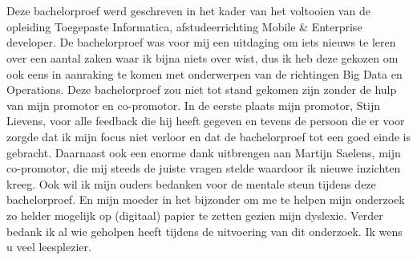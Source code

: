 
\chapter*{}%
\label{ch:voorwoord}

Deze bachelorproef werd geschreven in het kader van het voltooien van de opleiding Toegepaste Informatica, afstudeerrichting Mobile \& Enterprise developer.
De bachelorproef was voor mij een uitdaging om iets nieuws te leren over een aantal zaken waar ik bijna niets over wist, dus ik heb deze gekozen om ook eens in aanraking te komen met onderwerpen van de richtingen Big Data en Operations.
Deze bachelorproef zou niet tot stand gekomen zijn zonder de hulp van mijn promotor en co-promotor.
In de eerste plaats mijn promotor, Stijn Lievens, voor alle feedback die hij heeft gegeven en tevens de persoon die er voor zorgde dat ik mijn focus niet verloor en dat de bachelorproef tot een goed einde is gebracht.
Daarnaast ook een enorme dank uitbrengen aan Martijn Saelens, mijn co-promotor, die mij steeds de juiste vragen stelde waardoor ik nieuwe inzichten kreeg.
Ook wil ik mijn ouders bedanken voor de mentale steun tijdens deze bachelorproef. En mijn moeder in het bijzonder om me te helpen mijn onderzoek zo helder mogelijk op (digitaal) papier te zetten gezien mijn dyslexie.
Verder bedank ik al wie geholpen heeft tijdens de uitvoering van dit onderzoek.
\newline
Ik wens u veel leesplezier.